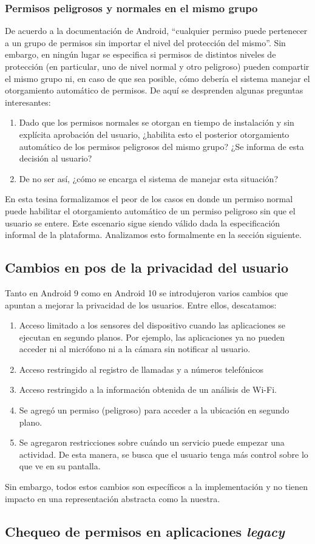 \subsubsection{Permisos peligrosos y normales en el mismo grupo}
De acuerdo a la documentación de Android, ``cualquier permiso puede pertenecer a un grupo de permisos sin
importar el nivel del protección del mismo''\cite{android-permissions}. Sin embargo, en ningún lugar se
especifica si permisos de distintos niveles de protección (en particular, uno de nivel normal y otro
peligroso) pueden compartir el mismo grupo ni, en caso de que sea posible, cómo debería el sistema
manejar el otorgamiento automático de permisos. De aquí se desprenden algunas preguntas interesantes:
\begin{enumerate}
    \item Dado que los permisos normales se otorgan en tiempo de instalación y sin explícita aprobación
    del usuario, ¿habilita esto el posterior otorgamiento automático de los permisos peligrosos del mismo
    grupo? ¿Se informa de esta decisión al usuario?
    \item De no ser así, ¿cómo se encarga el sistema de manejar esta situación? 
\end{enumerate}
En esta tesina formalizamos el peor de los casos en donde un permiso normal puede habilitar el
otorgamiento automático de un permiso peligroso sin que el usuario se entere. Este escenario sigue siendo
válido dada la especificación informal de la plataforma. Analizamos esto formalmente en la sección
siguiente.


\subsection{Cambios en pos de la privacidad del usuario}
Tanto en Android 9 como en Android 10 se introdujeron varios cambios que apuntan a mejorar la privacidad
de los usuarios. Entre ellos, descatamos:
\begin{enumerate}
    \item Acceso limitado a los sensores del dispositivo cuando las aplicaciones se ejecutan en segundo
    planos. Por ejemplo, las aplicaciones ya no pueden acceder ni al micrófono ni a la cámara sin
    notificar al usuario.
    \item Acceso restringido al registro de llamadas y a números telefónicos
    \item Acceso restringido a la información obtenida de un análisis de Wi-Fi.
    \item Se agregó un permiso (peligroso) para acceder a la ubicación en segundo plano.
    \item Se agregaron restricciones sobre cuándo un servicio puede empezar una actividad. De esta
    manera, se busca que el usuario tenga más control sobre lo que ve en su pantalla.
\end{enumerate}

Sin embargo, todos estos cambios son específicos a la implementación y no tienen impacto en una
representación abstracta como la nuestra.

\subsection{Chequeo de permisos en aplicaciones \textit{legacy}}